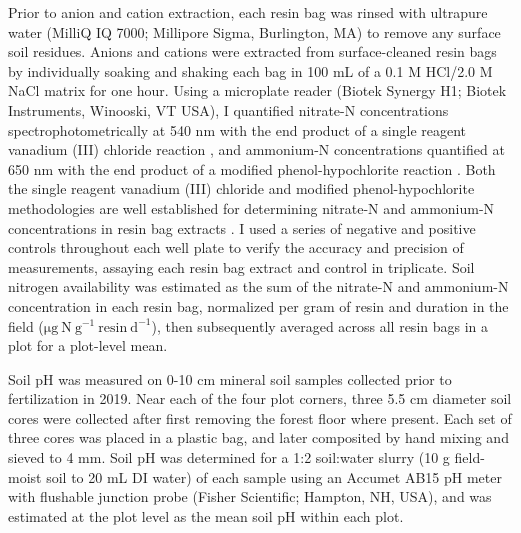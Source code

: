 Prior to anion and cation extraction, each resin bag was rinsed with ultrapure water (MilliQ IQ 7000; Millipore Sigma, Burlington, MA) to remove any surface soil residues. Anions and cations were extracted from surface-cleaned resin bags by individually soaking and shaking each bag in 100 mL of a 0.1 M HCl/2.0 M NaCl matrix for one hour. Using a microplate reader (Biotek Synergy H1; Biotek Instruments, Winooski, VT USA), I quantified nitrate-N concentrations spectrophotometrically at 540 nm with the end product of a single reagent vanadium (III) chloride reaction , and ammonium-N concentrations quantified at 650 nm with the end product of a modified phenol-hypochlorite reaction . Both the single reagent vanadium (III) chloride and modified phenol-hypochlorite methodologies are well established for determining nitrate-N and ammonium-N concentrations in resin bag extracts . I used a series of negative and positive controls throughout each well plate to verify the accuracy and precision of measurements, assaying each resin bag extract and control in triplicate. Soil nitrogen availability was estimated as the sum of the nitrate-N and ammonium-N concentration in each resin bag, normalized per gram of resin and duration in the field ($\mathrm{\mu g\ N\ g^{-1}\ resin\ d^{-1}}$), then subsequently averaged across all resin bags in a plot for a plot-level mean.
    
Soil pH was measured on 0-10 cm mineral soil samples collected prior to fertilization in 2019. Near each of the four plot corners, three 5.5 cm diameter soil cores were collected after first removing the forest floor where present. Each set of three cores was placed in a plastic bag, and later composited by hand mixing and sieved to 4 mm. Soil pH was determined for a 1:2 soil:water slurry (10 g field-moist soil to 20 mL DI water) of each sample using an Accumet AB15 pH meter with flushable junction probe (Fisher Scientific; Hampton, NH, USA), and was estimated at the plot level as the mean soil pH within each plot.

